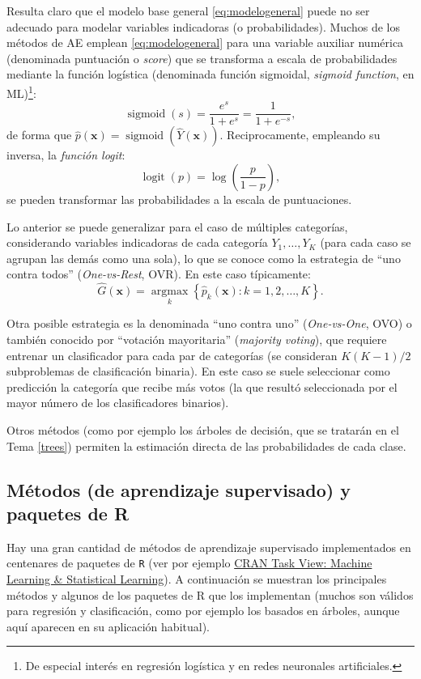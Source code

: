 \documentclass[
]{book}
\theoremstyle{break}
\theoremstyle{nonumberplain}
\begin{document}
Resulta claro que el modelo base general \eqref{eq:modelogeneral} puede no ser adecuado para modelar variables indicadoras (o probabilidades).
Muchos de los métodos de AE emplean \eqref{eq:modelogeneral} para una variable auxiliar numérica (denominada puntuación o \emph{score}) que se transforma a escala de probabilidades mediante la función logística (denominada función sigmoidal, \emph{sigmoid function}, en ML)\footnote{De especial interés en regresión logística y en redes neuronales artificiales.}: \[\operatorname{sigmoid}(s) = \frac{e^s}{1 + e^s}= \frac{1}{1 + e^{-s}},\] de forma que \(\hat p(\mathbf{x}) = \operatorname{sigmoid}(\hat Y(\mathbf{x}))\).
Reciprocamente, empleando su inversa, la \emph{función logit}: \[\operatorname{logit}(p)=\log\left( \frac{p}{1-p} \right),\] se pueden transformar las probabilidades a la escala de puntuaciones.

Lo anterior se puede generalizar para el caso de múltiples categorías, considerando variables indicadoras de cada categoría \(Y_1, \ldots, Y_K\) (para cada caso se agrupan las demás como una sola), lo que se conoce como la estrategia de ``uno contra todos'' (\emph{One-vs-Rest}, OVR).
En este caso típicamente: \[\hat G \left(\mathbf{x} \right) = \underset{k}{\operatorname{argmax}} \left\{ \hat p_k(\mathbf{x}) : k = 1, 2, \ldots, K \right\}.\]

Otra posible estrategia es la denominada ``uno contra uno'' (\emph{One-vs-One}, OVO) o también conocido por ``votación mayoritaria'' (\emph{majority voting}), que requiere entrenar un clasificador para cada par de categorías (se consideran \(K(K-1)/2\) subproblemas de clasificación binaria).
En este caso se suele seleccionar como predicción la categoría que recibe más votos (la que resultó seleccionada por el mayor número de los clasificadores binarios).

Otros métodos (como por ejemplo los árboles de decisión, que se tratarán en el Tema \ref{trees}) permiten la estimación directa de las probabilidades de cada clase.

\hypertarget{metodos-pkgs}{%
\subsection{Métodos (de aprendizaje supervisado) y paquetes de R}\label{metodos-pkgs}}

Hay una gran cantidad de métodos de aprendizaje supervisado implementados en centenares de paquetes de \texttt{R} (ver por ejemplo \href{https://cran.r-project.org/web/views/MachineLearning.html}{CRAN Task View: Machine Learning \& Statistical Learning}).
A continuación se muestran los principales métodos y algunos de los paquetes de R que los implementan (muchos son válidos para regresión y clasificación, como por ejemplo los basados en árboles, aunque aquí aparecen en su aplicación habitual).
\end{document}
